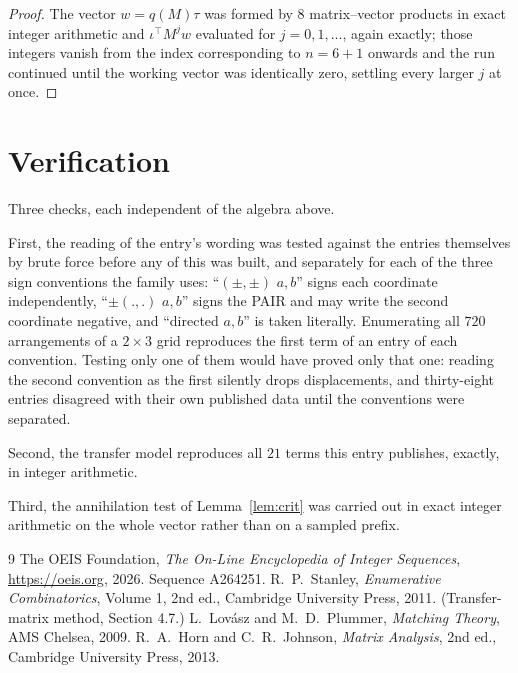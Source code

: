 \documentclass[11pt,a4paper]{article}
\theoremstyle{plain}
\theoremstyle{definition}
\begin{document}
\begin{proof}
The vector $w=q(M)\tau$ was formed by $8$ matrix--vector products in exact integer
arithmetic and $\iota^{\!\top}M^{j}w$ evaluated for $j=0,1,\dots$, again exactly; those
integers vanish from the index corresponding to $n=6+1$ onwards and the run continued
until the working vector was identically zero, settling every larger $j$ at once.
\end{proof}

\section{Verification}

Three checks, each independent of the algebra above.

First, the reading of the entry's wording was tested against the entries themselves by brute
force before any of this was built, and separately for each of the three sign conventions the
family uses: ``$(\pm,\pm)$ $a,b$'' signs each coordinate independently, ``$\pm(.,.)$ $a,b$''
signs the PAIR and may write the second coordinate negative, and ``directed $a,b$'' is taken
literally. Enumerating all $720$ arrangements of a $2\times3$ grid reproduces the first term
of an entry of each convention. Testing only one of them would have proved only that one:
reading the second convention as the first silently drops displacements, and thirty-eight
entries disagreed with their own published data until the conventions were separated.

Second, the transfer model reproduces all $21$ terms this entry publishes, exactly, in
integer arithmetic.

Third, the annihilation test of Lemma~\ref{lem:crit} was carried out in exact integer
arithmetic on the whole vector rather than on a sampled prefix.

\begin{thebibliography}{9}
 The OEIS Foundation, \emph{The On-Line Encyclopedia of Integer
Sequences}, \url{https://oeis.org}, 2026. Sequence A264251.
 R.~P.~Stanley, \emph{Enumerative Combinatorics}, Volume 1, 2nd ed.,
Cambridge University Press, 2011. (Transfer-matrix method, Section 4.7.)
 L.~Lov\'asz and M.~D.~Plummer, \emph{Matching Theory}, AMS Chelsea, 2009.
 R.~A.~Horn and C.~R.~Johnson, \emph{Matrix Analysis}, 2nd ed., Cambridge
University Press, 2013.
\end{thebibliography}
\end{document}
